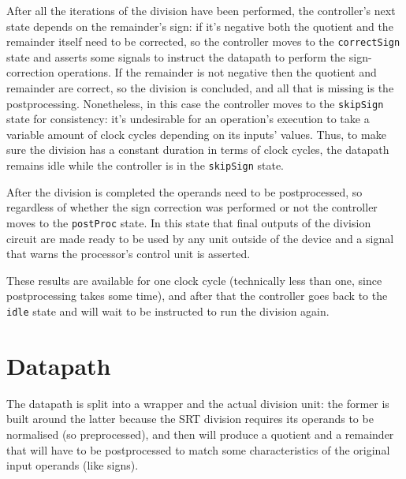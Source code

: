 After all the iterations of the division have been performed, the controller's next state depends on the remainder's sign: if it's negative both the quotient and the remainder itself need to be corrected, so the controller moves to the \texttt{correctSign} state and asserts some signals to instruct the datapath to perform the sign-correction operations.
If the remainder is not negative then the quotient and remainder are correct, so the division is concluded, and all that is missing is the postprocessing. 
Nonetheless, in this case the controller moves to the \texttt{skipSign} state for consistency: it's undesirable for an operation's execution to take a variable amount of clock cycles depending on its inputs' values.
Thus, to make sure the division has a constant duration in terms of clock cycles, the datapath remains idle while the controller is in the \texttt{skipSign} state.

After the division is completed the operands need to be postprocessed, so regardless of whether the sign correction was performed or not the controller moves to the \texttt{postProc} state. 
In this state that final outputs of the division circuit are made ready to be used by any unit outside of the device and a signal that warns the processor's control unit is asserted.

These results are available for one clock cycle (technically less than one, since postprocessing takes some time), and after that the controller goes back to the \texttt{idle} state and will wait to be instructed to run the division again.

\section{Datapath}\label{sect:srt_datapath}
The datapath is split into a wrapper and the actual division unit: the former is built around the latter because the SRT division requires its operands to be normalised (so preprocessed), and then will produce a quotient and a remainder that will have to be postprocessed to match some characteristics of the original input operands (like signs).

